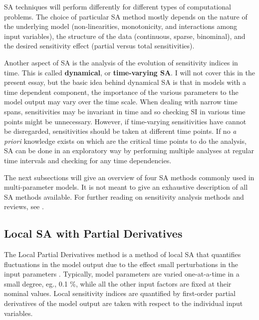 \documentclass[12pt]{article}
\begin{document}
SA techniques will perform differently for different types of computational problems. The choice of particular SA method mostly depends on the nature of the underlying model (non-linearities, monotonicity, and interactions among input variables), the structure of the data (continuous, sparse, binominal), and the desired sensitivity effect (partial versus total sensitivities). 

Another aspect of SA is the analysis of the evolution of sensitivity indices in time. This is called \textbf{dynamical}, or \textbf{time-varying SA}. I will not cover this in the present essay, but the basic idea behind dynamical SA is that in models with a time dependent component, the importance of the various parameters to the model output may vary over the time scale. When dealing with narrow time spans, sensitivities may be invariant in time and so checking SI in various time points might be unnecessary. However, if time-varying sensitivities have cannot be disregarded, sensitivities should be taken at different time points. If no \textit{a priori} knowledge exists on which are the critical time points to do the analysis, SA can be done in an exploratory way by performing multiple analyses at regular time intervals and checking for any time dependencies.

\vspace{0.5cm	}
The next subsections will give an overview of four SA methods commonly used in multi-parameter models. It is not meant to give an exhaustive description of all SA methods available. For further reading on sensitivity analysis methods and reviews, see \cite{SaltelliThePrimer, iooss:hal-00975701, HELTON20061175,Saltelli2000,SaltelliGuide}.

\subsection{Local SA with Partial Derivatives}

The Local Partial Derivatives method is a method of local SA that quantifies fluctuations in the model output due to the effect small perturbations in the input parameters \cite{Turanyi1990}. Typically, model parameters are varied one-at-a-time in a small degree, eg., 0.1 \%, while all the other input factors are fixed at their nominal values. Local sensitivity indices are quantified by first-order partial derivatives of the model output are taken with respect to the individual input variables. 
\end{document}
